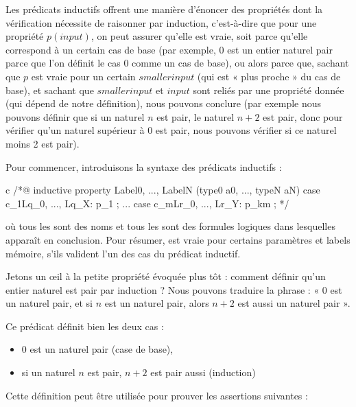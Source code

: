 Les prédicats inductifs offrent une manière d'énoncer des propriétés dont la
vérification nécessite de raisonner par induction, c'est-à-dire que pour une propriété
$p(input)$, on peut assurer qu'elle est vraie, soit parce qu'elle correspond à un
certain cas de base (par exemple, $0$ est un entier naturel pair parce que l'on
définit le cas 0 comme un cas de base), ou alors parce que, sachant que $p$ est vraie
pour un certain $smaller input$ (qui est « plus proche » du cas de base), et sachant
que $smaller input$ et $input$ sont reliés par une propriété donnée (qui dépend
de notre définition), nous pouvons conclure (par exemple nous pouvons définir que
si un naturel $n$ est pair, le naturel $n+2$ est pair, donc pour vérifier qu'un
naturel supérieur à 0 est pair, nous pouvons vérifier si ce naturel moins 2 est
pair).





Pour commencer, introduisons la syntaxe des prédicats inductifs :
\begin{CodeBlock}{c}
/*@
  inductive property{ Label0, ..., LabelN }(type0 a0, ..., typeN aN) {
  case c_1{Lq_0, ..., Lq_X}: p_1 ;
  ...
  case c_m{Lr_0, ..., Lr_Y}: p_km ;
  }
*/
\end{CodeBlock}
où tous les  sont des noms et tous les  sont
des formules logiques dans lesquelles  apparaît en conclusion. Pour résumer,
 est vraie pour certains paramètres et labels mémoire, s'ils
valident l'un des cas du prédicat inductif.


Jetons un \oe{}il à la petite propriété évoquée plus tôt : comment définir
qu'un entier naturel est pair par induction ? Nous pouvons traduire la phrase :
« 0 est un naturel pair, et si $n$ est un naturel pair, alors $n+2$ est aussi un
naturel pair ».




Ce prédicat définit bien les deux cas :


\begin{itemize}
\item $0$ est un naturel pair (case de base),
\item si un naturel $n$ est pair, $n+2$ est pair aussi (induction)
\end{itemize}


Cette définition peut être utilisée pour prouver les assertions suivantes :




